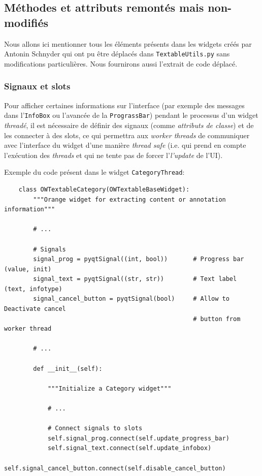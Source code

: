 \documentclass{article}
\begin{document}
\subsection{Méthodes et attributs remontés mais non-modifiés}

Nous allons ici mentionner tous les éléments présents dans les widgets créés par Antonin Schnyder qui ont pu être déplacés dans \texttt{TextableUtils.py} sans modifications particulières. Nous fournirons aussi l'extrait de code déplacé.

\subsubsection{Signaux et slots}

Pour afficher certaines informations sur l'interface (par exemple des messages dans l'\texttt{InfoBox} ou l'avancée de la \texttt{PrograssBar}) pendant le processus d'un widget \textit{threadé}, il est nécessaire de définir des signaux (comme \textit{attributs de classe}) et de les connecter à des slots, ce qui permettra aux \textit{worker threads} de communiquer avec l'interface du widget d'une manière \textit{thread safe} (i.e. qui prend en compte l'exécution des \textit{threads} et qui ne tente pas de forcer l'\textit{l'update} de l'UI). 
\newline

Exemple du code présent dans le widget \texttt{CategoryThread}:


\begin{verbatim}
    class OWTextableCategory(OWTextableBaseWidget):
        """Orange widget for extracting content or annotation information"""

        # ...

        # Signals
        signal_prog = pyqtSignal((int, bool))       # Progress bar (value, init)
        signal_text = pyqtSignal((str, str))        # Text label (text, infotype)
        signal_cancel_button = pyqtSignal(bool)     # Allow to Deactivate cancel
                                                    # button from worker thread

        # ...
        
        def __init__(self):

            """Initialize a Category widget"""

            # ...

            # Connect signals to slots
            self.signal_prog.connect(self.update_progress_bar) 
            self.signal_text.connect(self.update_infobox)
            self.signal_cancel_button.connect(self.disable_cancel_button)
\end{verbatim}
\end{document}
